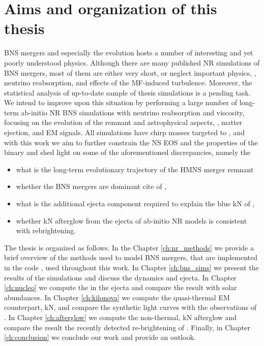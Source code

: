 
\section{Aims and organization of this thesis}

\ac{BNS} mergers and especially the \pmerg{} evolution hosts a number of interesting 
and yet poorly understood physics. Although there are many published \ac{NR} simulations of \ac{BNS} mergers, 
most of them are either very short, or neglect important physics, \eg, neutrino reabsorption, 
and effects of the \ac{MF}-induced turbulence. 
Moreover, the statistical analysis of up-to-date sample of thesis 
simulations is a pending task.
%
We intend to improve upon this situation by performing a large number of long-term ab-initio 
\ac{NR} \ac{BNS} simulations with neutrino reabsorption and viscosity, focusing on the 
\pmerg{} evolution of the remnant and astrophysical aspects, \ie, matter ejection, 
\rproc{} \nuc{} and \ac{EM} signals.
%
All simulations have chirp masses targeted to \GW{}, and with this work we aim to further 
constrain the \ac{NS} \ac{EOS} and the properties of the binary and shed light on 
some of the aforementioned discrepancies, namely the 
\begin{itemize}
    \item what is the long-term evolutionary trajectory of the \ac{HMNS} merger remnant
    \item whether the \ac{BNS} mergers are dominant cite of \rproc{}, 
    \item what is the additional ejecta component required to explain the blue \ac{kN} of \AT{}, 
    \item whether \ac{kN} afterglow from the ejecta of ab-initio \ac{NR} models is consistent with \GRB{} rebrightening.
\end{itemize}

The thesis is organized as follows.
In the Chapter \ref{ch:nr_methods} we provide a brief overview of the methods used to model  \ac{BNS} mergers, 
that are implemented in the code \wisky{}, used throughout this work.
In Chapter \ref{ch:bns_sims} we present the results of the simulations and discuss the \pmerg{} dynamics and ejecta.
In Chapter \ref{ch:nucleo} we compute the \rproc{} \nuc{} in the ejecta and compare the result with 
solar abundances.
In Chapter \ref{ch:kilonova} we compute the quasi-thermal \ac{EM} counterpart, \ac{kN}, and compare 
the synthetic light curves with the observations of \AT{}.
In Chapter \ref{ch:afterglow} we compute the non-thermal, \ac{kN} afterglow and compare the 
result the recently detected re-brightening of \GRB{}.
Finally, in Chapter \ref{ch:conclusion} we conclude our work and provide an outlook.